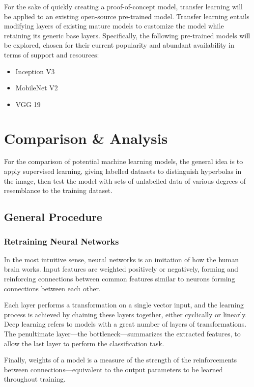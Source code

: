 \documentclass[se,blockletter]{uw-wkrpt}
\begin{document}
For the sake of quickly creating a proof-of-concept model, transfer learning will be applied to an existing open-source pre-trained model. Transfer learning entails modifying layers of existing mature models to customize the model while retaining its generic base layers. Specifically, the following pre-trained models will be explored, chosen for their current popularity and abundant availability in terms of support and resources: 
\begin{itemize}
\item Inception V3
\item MobileNet V2
\item VGG 19
\end{itemize}

\section{Comparison \& Analysis}
For the comparison of potential machine learning models, the general idea is to apply supervised learning, giving labelled datasets to distinguish hyperbolas in the image, then test the model with sets of unlabelled data of various degrees of resemblance to the training dataset.

\subsection{General Procedure}
\subsubsection{Retraining Neural Networks}
In the most intuitive sense, neural networks is an imitation of how the human brain works. Input features are weighted positively or negatively, forming and reinforcing connections between common features similar to neurons forming connections between each other.

Each layer performs a transformation on a single vector input, and the learning process is achieved by chaining these layers together, either cyclically or linearly. Deep learning refers to models with a great number of layers of transformations. The penultimate layer---the bottleneck---summarizes the extracted features, to allow the last layer to perform the classification task. 

Finally, weights of a model is a measure of the strength of the reinforcements between connections---equivalent to the output parameters to be learned throughout training. 
\end{document}
